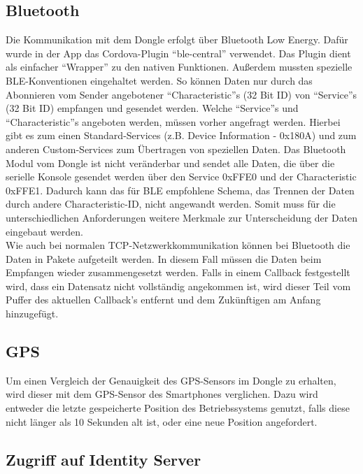 \subsection{Bluetooth}
\label{sec:appBluetooth}

Die Kommunikation mit dem Dongle erfolgt über Bluetooth Low Energy. Dafür wurde in der App das Cordova-Plugin \enquote{ble-central} verwendet. Das Plugin dient als einfacher \enquote{Wrapper} zu den nativen Funktionen. Außerdem mussten spezielle BLE-Konventionen eingehaltet werden. So können Daten nur durch das Abonnieren vom Sender angebotener \enquote{Characteristic}s (32 Bit ID) von \enquote{Service}s (32 Bit ID) empfangen und gesendet werden. Welche \enquote{Service}s und \enquote{Characteristic}s angeboten werden, müssen vorher angefragt  werden. Hierbei gibt es zum einen Standard-Services (z.B. Device Information - 0x180A) und zum anderen Custom-Services zum Übertragen von speziellen Daten. Das Bluetooth Modul vom Dongle ist nicht veränderbar und sendet alle Daten, die über die serielle Konsole gesendet werden über den Service 0xFFE0 und der Characteristic 0xFFE1. Dadurch kann das für BLE empfohlene Schema, das Trennen der Daten durch andere Characteristic-ID, nicht angewandt werden. Somit muss für die unterschiedlichen Anforderungen weitere Merkmale zur Unterscheidung der Daten eingebaut werden.\cite{BluetoothLowEnergy}
\\
Wie auch bei normalen TCP-Netzwerkkommunikation können bei Bluetooth die Daten in Pakete aufgeteilt werden. In diesem Fall müssen die Daten beim Empfangen wieder zusammengesetzt werden. Falls in einem Callback festgestellt wird, dass ein Datensatz nicht vollständig angekommen ist, wird dieser Teil vom Puffer des aktuellen Callback's entfernt und dem Zukünftigen am Anfang hinzugefügt.

\subsection{GPS}
\label{sec:appGPS}

Um einen Vergleich der Genauigkeit des GPS-Sensors im Dongle zu erhalten, wird dieser mit dem GPS-Sensor des Smartphones verglichen. Dazu wird entweder die letzte gespeicherte Position des Betriebssystems genutzt, falls diese nicht länger als 10 Sekunden alt ist, oder eine neue Position angefordert.

\subsection{Zugriff auf Identity Server}

